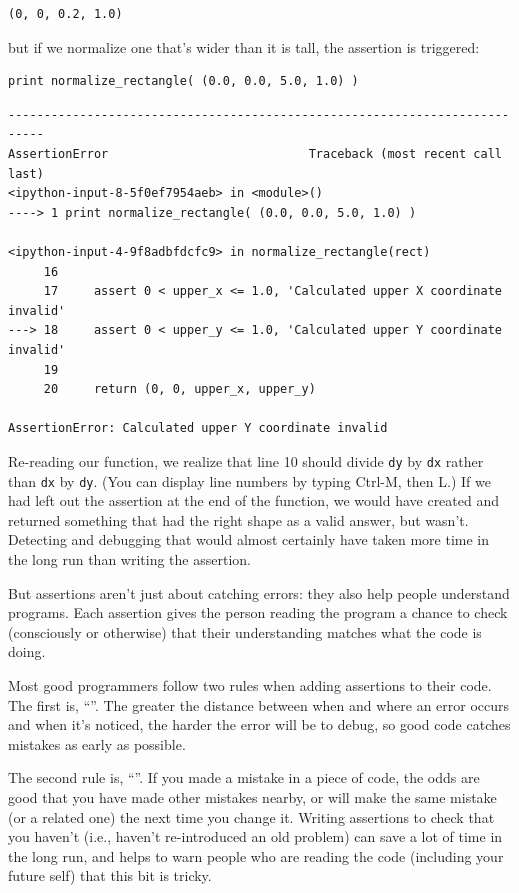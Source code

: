 \documentclass{book}
\begin{document}
\begin{verbatim}
(0, 0, 0.2, 1.0)
\end{verbatim}

but if we normalize one that's wider than it is tall, the assertion is
triggered:

\begin{verbatim}
print normalize_rectangle( (0.0, 0.0, 5.0, 1.0) )
\end{verbatim}

\begin{verbatim}
---------------------------------------------------------------------------
AssertionError                            Traceback (most recent call last)
<ipython-input-8-5f0ef7954aeb> in <module>()
----> 1 print normalize_rectangle( (0.0, 0.0, 5.0, 1.0) )

<ipython-input-4-9f8adbfdcfc9> in normalize_rectangle(rect)
     16
     17     assert 0 < upper_x <= 1.0, 'Calculated upper X coordinate invalid'
---> 18     assert 0 < upper_y <= 1.0, 'Calculated upper Y coordinate invalid'
     19
     20     return (0, 0, upper_x, upper_y)

AssertionError: Calculated upper Y coordinate invalid
\end{verbatim}

Re-reading our function, we realize that line 10 should divide
\texttt{dy} by \texttt{dx} rather than \texttt{dx} by \texttt{dy}. (You
can display line numbers by typing Ctrl-M, then L.) If we had left out
the assertion at the end of the function, we would have created and
returned something that had the right shape as a valid answer, but
wasn't. Detecting and debugging that would almost certainly have taken
more time in the long run than writing the assertion.

But assertions aren't just about catching errors: they also help people
understand programs. Each assertion gives the person reading the program
a chance to check (consciously or otherwise) that their understanding
matches what the code is doing.

Most good programmers follow two rules when adding assertions to their
code. The first is, ``''. The greater the distance between when and where an
error occurs and when it's noticed, the harder the error will be to
debug, so good code catches mistakes as early as possible.

The second rule is,
``''. If you made a mistake in a piece of code,
the odds are good that you have made other mistakes nearby, or will make
the same mistake (or a related one) the next time you change it. Writing
assertions to check that you haven't 
(i.e., haven't re-introduced an old problem) can save a lot of time in
the long run, and helps to warn people who are reading the code
(including your future self) that this bit is tricky.
\end{document}
